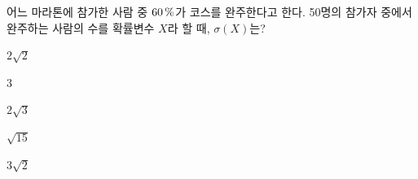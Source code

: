 어느 마라톤에 참가한 사람 중 $60\mkern3mu \%$가 코스를 완주한다고 한다. 50명의 참가자 중에서 완주하는 사람의 수를 확률변수 $X$라 할 때, $\sigma(X)$는?
\begin{choices32}{\rule[-3ex]{0pt}{8ex}$2\sqrt{2}$}{\rule[-3ex]{0pt}{8ex}$3$}{\rule[-3ex]{0pt}{8ex}$2\sqrt{3}$}{\rule[-3ex]{0pt}{8ex}$\sqrt{15}$}{\rule[-3ex]{0pt}{8ex}$3\sqrt{2}$}\end{choices32}
